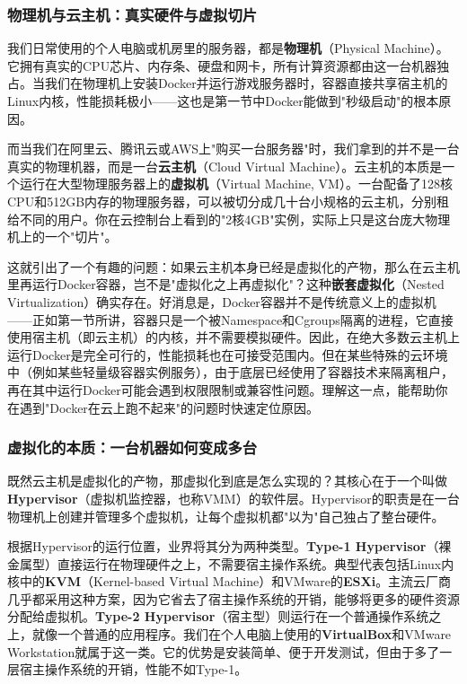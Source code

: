 \subsubsection{物理机与云主机：真实硬件与虚拟切片}

我们日常使用的个人电脑或机房里的服务器，都是\textbf{物理机}（Physical Machine）。它拥有真实的CPU芯片、内存条、硬盘和网卡，所有计算资源都由这一台机器独占。当我们在物理机上安装Docker并运行游戏服务器时，容器直接共享宿主机的Linux内核，性能损耗极小——这也是第一节中Docker能做到"秒级启动"的根本原因。

而当我们在阿里云、腾讯云或AWS上"购买一台服务器"时，我们拿到的并不是一台真实的物理机器，而是一台\textbf{云主机}（Cloud Virtual Machine）。云主机的本质是一个运行在大型物理服务器上的\textbf{虚拟机}（Virtual Machine, VM）。一台配备了128核CPU和512GB内存的物理服务器，可以被切分成几十台小规格的云主机，分别租给不同的用户。你在云控制台上看到的"2核4GB"实例，实际上只是这台庞大物理机上的一个"切片"。

这就引出了一个有趣的问题：如果云主机本身已经是虚拟化的产物，那么在云主机里再运行Docker容器，岂不是"虚拟化之上再虚拟化"？这种\textbf{嵌套虚拟化}（Nested Virtualization）确实存在。好消息是，Docker容器并不是传统意义上的虚拟机——正如第一节所讲，容器只是一个被Namespace和Cgroups隔离的进程，它直接使用宿主机（即云主机）的内核，并不需要模拟硬件。因此，在绝大多数云主机上运行Docker是完全可行的，性能损耗也在可接受范围内。但在某些特殊的云环境中（例如某些轻量级容器实例服务），由于底层已经使用了容器技术来隔离租户，再在其中运行Docker可能会遇到权限限制或兼容性问题。理解这一点，能帮助你在遇到"Docker在云上跑不起来"的问题时快速定位原因。

\subsubsection{虚拟化的本质：一台机器如何变成多台}

既然云主机是虚拟化的产物，那虚拟化到底是怎么实现的？其核心在于一个叫做\textbf{Hypervisor}（虚拟机监控器，也称VMM）的软件层。Hypervisor的职责是在一台物理机上创建并管理多个虚拟机，让每个虚拟机都"以为"自己独占了整台硬件。

根据Hypervisor的运行位置，业界将其分为两种类型。\textbf{Type-1 Hypervisor}（裸金属型）直接运行在物理硬件之上，不需要宿主操作系统。典型代表包括Linux内核中的\textbf{KVM}（Kernel-based Virtual Machine）和VMware的\textbf{ESXi}。主流云厂商几乎都采用这种方案，因为它省去了宿主操作系统的开销，能够将更多的硬件资源分配给虚拟机。\textbf{Type-2 Hypervisor}（宿主型）则运行在一个普通操作系统之上，就像一个普通的应用程序。我们在个人电脑上使用的\textbf{VirtualBox}和VMware Workstation就属于这一类。它的优势是安装简单、便于开发测试，但由于多了一层宿主操作系统的开销，性能不如Type-1。

